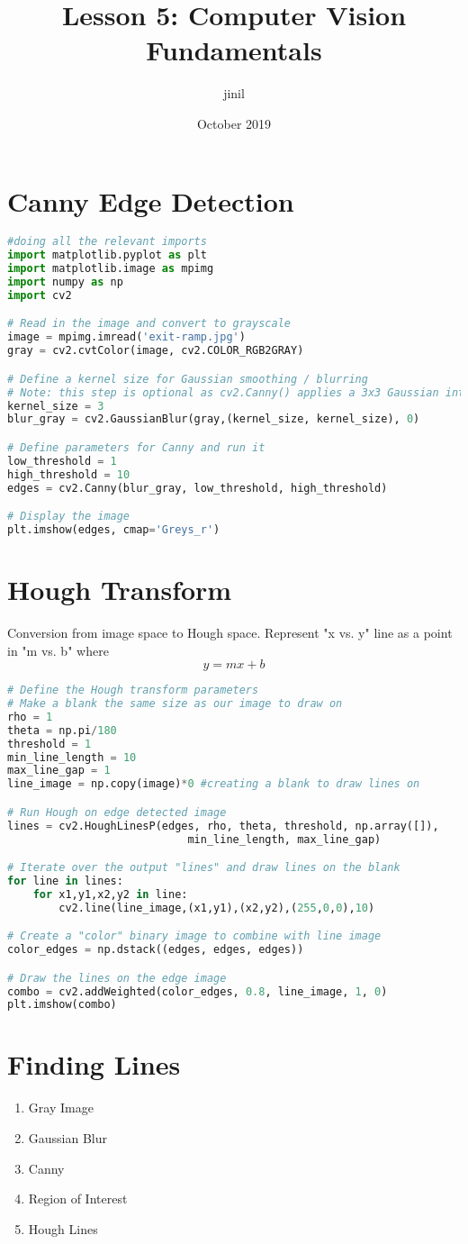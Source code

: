 \documentclass[12pt]{article}
\title{Lesson 5: Computer Vision Fundamentals}
\author{jinil }
\date{October 2019}
\begin{document}
\maketitle

\section{Canny Edge Detection}

\begin{lstlisting}[language=Python]
#doing all the relevant imports
import matplotlib.pyplot as plt
import matplotlib.image as mpimg
import numpy as np
import cv2

# Read in the image and convert to grayscale
image = mpimg.imread('exit-ramp.jpg')
gray = cv2.cvtColor(image, cv2.COLOR_RGB2GRAY)

# Define a kernel size for Gaussian smoothing / blurring
# Note: this step is optional as cv2.Canny() applies a 3x3 Gaussian internally
kernel_size = 3
blur_gray = cv2.GaussianBlur(gray,(kernel_size, kernel_size), 0)

# Define parameters for Canny and run it
low_threshold = 1
high_threshold = 10
edges = cv2.Canny(blur_gray, low_threshold, high_threshold)

# Display the image
plt.imshow(edges, cmap='Greys_r')
\end{lstlisting}

\section{Hough Transform}
Conversion from image space to Hough space.
Represent "x vs. y" line as a point in "m vs. b" where
\[y = mx + b\]

\begin{lstlisting}[language=Python]
# Define the Hough transform parameters
# Make a blank the same size as our image to draw on
rho = 1
theta = np.pi/180
threshold = 1
min_line_length = 10
max_line_gap = 1
line_image = np.copy(image)*0 #creating a blank to draw lines on

# Run Hough on edge detected image
lines = cv2.HoughLinesP(edges, rho, theta, threshold, np.array([]),
                            min_line_length, max_line_gap)

# Iterate over the output "lines" and draw lines on the blank
for line in lines:
    for x1,y1,x2,y2 in line:
        cv2.line(line_image,(x1,y1),(x2,y2),(255,0,0),10)

# Create a "color" binary image to combine with line image
color_edges = np.dstack((edges, edges, edges)) 

# Draw the lines on the edge image
combo = cv2.addWeighted(color_edges, 0.8, line_image, 1, 0) 
plt.imshow(combo)
\end{lstlisting}

\section{Finding Lines}
\begin{enumerate}
    \item Gray Image
    \item Gaussian Blur
    \item Canny
    \item Region of Interest
    \item Hough Lines
\end{enumerate}
\end{document}
